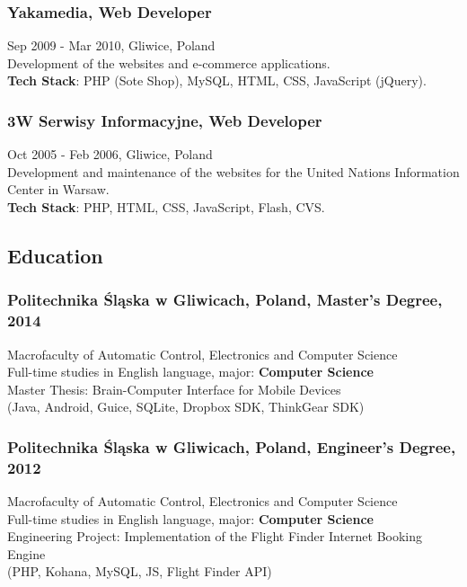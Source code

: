 \documentclass{article}
\begin{document}
      \subsubsection*{Yakamedia, Web Developer}
      Sep 2009 - Mar 2010, Gliwice, Poland\\[0.3em]
      Development of the websites and e-commerce applications.\\
      \textbf{Tech Stack}: PHP (Sote Shop), MySQL, HTML, CSS, JavaScript (jQuery).
      

      \subsubsection*{3W Serwisy Informacyjne, Web Developer}
      Oct 2005 - Feb 2006, Gliwice, Poland\\[0.3em]
      Development and maintenance of the websites for the United Nations Information Center in Warsaw.\\
      \textbf{Tech Stack}: PHP, HTML, CSS, JavaScript, Flash, CVS.
      
    \subsection*{Education}
    
      \subsubsection*{Politechnika \'Sl\k{a}ska w Gliwicach, Poland, Master's Degree, 2014}
      Macrofaculty of Automatic Control, Electronics and Computer Science\\
      \small{Full-time studies in English language, major: \textbf{Computer Science}}\\
      \small{Master Thesis: Brain-Computer Interface for Mobile Devices}\\
      \small{(Java, Android, Guice, SQLite, Dropbox SDK, ThinkGear SDK)}
    
      \subsubsection*{Politechnika \'Sl\k{a}ska w Gliwicach, Poland, Engineer's Degree, 2012}
      Macrofaculty of Automatic Control, Electronics and Computer Science\\
      \small{Full-time studies in English language, major: \textbf{Computer Science}}\\
      \small{Engineering Project: Implementation of the Flight Finder Internet Booking Engine}\\
      \small{(PHP, Kohana, MySQL, JS, Flight Finder API)}
\end{document}
